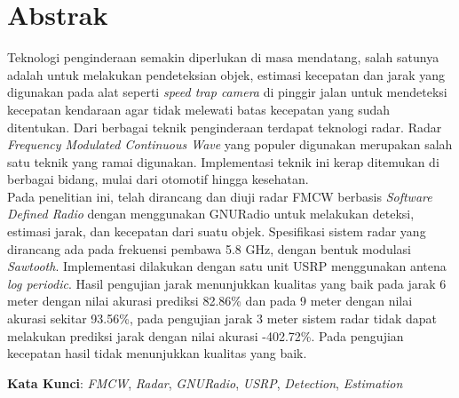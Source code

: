 
\chapter*{Abstrak}
\vspace*{0.7cm}

Teknologi penginderaan semakin diperlukan di masa mendatang, salah satunya adalah untuk melakukan pendeteksian objek, estimasi kecepatan dan jarak yang digunakan pada alat seperti \textit{speed trap camera} di pinggir jalan untuk mendeteksi kecepatan kendaraan agar tidak melewati batas kecepatan yang sudah ditentukan. Dari berbagai teknik penginderaan terdapat teknologi radar. Radar \textit{Frequency Modulated Continuous Wave} yang populer digunakan merupakan salah satu teknik yang ramai digunakan. Implementasi teknik ini kerap ditemukan di berbagai bidang, mulai dari otomotif hingga kesehatan.\\

Pada penelitian ini, telah dirancang dan diuji radar FMCW berbasis \textit{Software Defined Radio} dengan menggunakan GNURadio untuk melakukan deteksi, estimasi jarak, dan kecepatan dari suatu objek. Spesifikasi sistem radar yang dirancang ada pada frekuensi pembawa 5.8 GHz, dengan bentuk modulasi \textit{Sawtooth}. Implementasi dilakukan dengan satu unit USRP menggunakan antena \textit{log periodic}. Hasil pengujian jarak menunjukkan kualitas yang baik pada jarak 6 meter dengan nilai akurasi prediksi 82.86\% dan pada 9 meter dengan nilai akurasi sekitar 93.56\%, pada pengujian jarak 3 meter sistem radar tidak dapat melakukan prediksi jarak dengan nilai akurasi -402.72\%. Pada pengujian kecepatan hasil tidak menunjukkan kualitas yang baik.



\vspace*{0.2cm}

\noindent \textbf{Kata Kunci}: \textit{FMCW}, \textit{Radar}, \textit{GNURadio}, \textit{USRP}, \textit{Detection}, \textit{Estimation}\\ 

\newpage